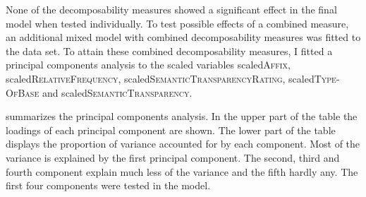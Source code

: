 None of the decomposability measures showed a significant effect in the final model when tested individually. To test possible effects of a combined  measure, an additional mixed model with combined decomposability measures was fitted to the data set.  
To attain these combined decomposability measures, I fitted a principal components analysis to the scaled variables scaled\textsc{Affix}, scaled\textsc{RelativeFrequency}, scaled\textsc{SemanticTransparencyRating}, scaled\textsc{Type-OfBase} and scaled\textsc{SemanticTransparency}.





 summarizes the principal components analysis. In the upper part of the table the loadings of each principal component are shown. The lower part of the table displays the proportion of variance accounted for by each component. 
Most of the variance is explained by the first principal component. The second, third and fourth component explain much less of the variance and the fifth hardly any.  The first four components were tested in the model. 


\begin{table}[b]
	\caption{Summary of principal components}
	\label{tbl: summary PC im exp}
\end{table}



